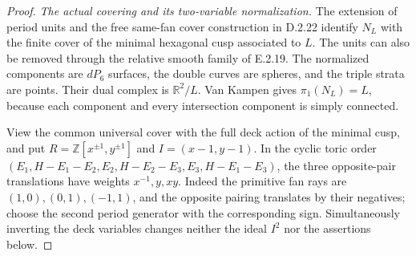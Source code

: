 \begin{proof}
\emph{The actual covering and its two-variable normalization.}
The extension of period units and the free same-fan
cover construction in D.2.22 identify $N_L$ with
the finite cover of the minimal hexagonal cusp
associated to $L$. The units can also be removed
through the relative smooth family of E.2.19.
The normalized components are $dP_6$ surfaces,
the double curves are spheres, and the triple
strata are points. Their dual complex is
$\mathbb R^2/L$. Van Kampen gives
$\pi_1(N_L)=L$, because each component and every
intersection component is simply connected.

View the common universal cover with the full deck
action of the minimal cusp, and put
$R=\mathbb Z[x^{\pm1},y^{\pm1}]$ and
$I=(x-1,y-1)$. In the cyclic toric order
$(E_1,H-E_1-E_2,E_2,H-E_2-E_3,E_3,H-E_1-E_3)$,
the three opposite-pair translations have
weights $x^{-1},y,xy$. Indeed the primitive
fan rays are $(1,0),(0,1),(-1,1)$, and the
opposite pairing translates by their negatives;
choose the second period generator with the
corresponding sign. Simultaneously inverting
the deck variables changes neither the ideal
$I^2$ nor the assertions below.


\end{proof}
